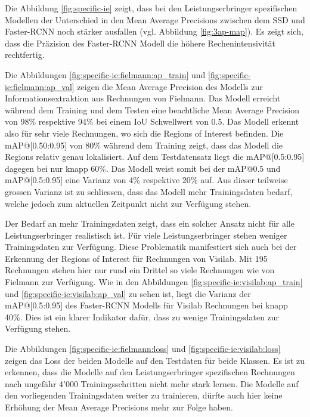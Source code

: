 Die Abbildung \ref{fig:specific-ie} zeigt, dass bei den Leistungserbringer spezifischen Modellen der Unterschied in den Mean Average Precisions zwischen dem SSD und Faster-RCNN noch stärker ausfallen (vgl. Abbildung \ref{fig:3ap-map}). Es zeigt sich, dass die Präzision des Faster-RCNN Modell die höhere Rechenintensivität rechtfertig.

Die Abbildungen \ref{fig:specific-ie:fielmann:ap_train} und \ref{fig:specific-ie:fielmann:ap_val} zeigen die Mean Average Precision des Modells zur Informationsextraktion aus Rechnungen von Fielmann. Das Modell erreicht während dem Training und dem Testen eine beachtliche Mean Average Precision von 98\% respektive 94\% bei einem IoU Schwellwert von 0.5. Das Modell erkennt also für sehr viele Rechnungen, wo sich die Regions of Interest befinden. Die mAP@[0.50:0.95] von 80\% während dem Training zeigt, dass das Modell die Regions relativ genau lokalisiert. Auf dem Testdatensatz liegt die mAP@[0.5:0.95] dagegen bei nur knapp 60\%. Das Modell weist somit bei der mAP@0.5 und mAP@[0.5:0.95] eine Varianz von 4\% respektive 20\% auf. Aus dieser teilweise grossen Varianz ist zu schliessen, dass das Modell mehr Trainingsdaten bedarf, welche jedoch zum aktuellen Zeitpunkt nicht zur Verfügung stehen.

Der Bedarf an mehr Trainingsdaten zeigt, dass ein solcher Ansatz nicht für alle Leistungserbringer realistisch ist. Für viele Leistungserbringer stehen weniger Trainingsdaten zur Verfügung. Diese Problematik manifestiert sich auch bei der Erkennung der Regions of Interest für Rechnungen von Visilab. Mit 195 Rechnungen stehen hier nur rund ein Drittel so viele Rechnungen wie von Fielmann zur Verfügung. Wie in den Abbildungen \ref{fig:specific-ie:visilab:ap_train} und \ref{fig:specific-ie:visilab:ap_val} zu sehen ist, liegt die Varianz der mAP@[0.5:0.95] des Faster-RCNN Modells für Visilab Rechnungen bei knapp 40\%. Dies ist ein klarer Indikator dafür, dass zu wenige Trainingsdaten zur Verfügung stehen.

Die Abbildungen \ref{fig:specific-ie:fielmann:loss} und \ref{fig:specific-ie:visilab:loss} zeigen das Loss der beiden Modelle auf den Testdaten für beide Klassen. Es ist zu erkennen, dass die Modelle auf den Leistungserbringer spezifischen Rechnungen nach ungefähr 4'000 Trainingsschritten nicht mehr stark lernen. Die Modelle auf den vorliegenden Trainingsdaten weiter zu trainieren, dürfte auch hier keine Erhöhung der Mean Average Precisions mehr zur Folge haben.

